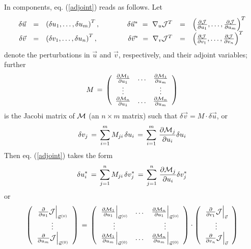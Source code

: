 In components, eq. (\ref{adjoint}) reads as follows.
Let
\[
\begin{array}{rclcrcl}
\delta \vec{u} & = &
\left( \delta u_1,\ldots, \delta u_m \right)^T , & \qquad &
\delta \vec{u}^{\ast} \,\, = \,\, \nabla_u {\cal J}^T & = &
\left( 
\frac{\partial {\cal J}}{\partial u_1},\ldots, 
\frac{\partial {\cal J}}{\partial u_m}
\right)^T \\
\delta \vec{v} & = &
\left( \delta v_1,\ldots, \delta u_n \right)^T , & \qquad &
\delta \vec{v}^{\ast} \,\, = \,\, \nabla_v {\cal J}^T & = &
\left( 
\frac{\partial {\cal J}}{\partial v_1},\ldots, 
\frac{\partial {\cal J}}{\partial v_n}
\right)^T \\
\end{array}
\]
denote the perturbations in $\vec{u}$ and $\vec{v}$, respectively,
and their adjoint variables;
further
\[
M \, = \, \left(
\begin{array}{ccc}
\frac{\partial {\cal M}_1}{\partial u_1} & \ldots &
\frac{\partial {\cal M}_1}{\partial u_m} \\
\vdots & ~ & \vdots \\
\frac{\partial {\cal M}_n}{\partial u_1} & \ldots &
\frac{\partial {\cal M}_n}{\partial u_m} \\
\end{array}
\right)
\]
is the Jacobi matrix of $ {\cal M} $ 
(an $ n \times m $ matrix)
such that $ \delta \vec{v} = M \cdot \delta \vec{u} $, or
\[
\delta v_{j} 
\, = \, \sum_{i=1}^m M_{ji} \, \delta u_{i}
\, = \, \sum_{i=1}^m \, \frac{\partial {\cal M}_{j}}{\partial u_{i}} 
\delta u_{i}
\]
%
Then eq. (\ref{adjoint}) takes the form
\[
\delta u_{i}^{\ast} 
\, = \, \sum_{j=1}^n M_{ji} \, \delta v_{j}^{\ast}
\, = \, \sum_{j=1}^n \, \frac{\partial {\cal M}_{j}}{\partial u_{i}} 
\delta v_{j}^{\ast}
\]
%
or
%
\[
\left(
\begin{array}{c}
\left. \frac{\partial}{\partial u_1} {\cal J} \right|_{\vec{u}^{(0)}} \\
\vdots \\
\left. \frac{\partial}{\partial u_m} {\cal J} \right|_{\vec{u}^{(0)}} \\
\end{array}
\right)
\, = \,
\left(
\begin{array}{ccc}
\left. \frac{\partial {\cal M}_1}{\partial u_1} \right|_{\vec{u}^{(0)}} 
& \ldots &
\left. \frac{\partial {\cal M}_n}{\partial u_1} \right|_{\vec{u}^{(0)}} \\
\vdots & ~ & \vdots \\
\left. \frac{\partial {\cal M}_1}{\partial u_m} \right|_{\vec{u}^{(0)}} 
& \ldots &
\left. \frac{\partial {\cal M}_n}{\partial u_m} \right|_{\vec{u}^{(0)}} \\
\end{array}
\right)
\cdot
\left(
\begin{array}{c}
\left. \frac{\partial}{\partial v_1} {\cal J} \right|_{\vec{v}} \\
\vdots \\
\left. \frac{\partial}{\partial v_n} {\cal J} \right|_{\vec{v}} \\
\end{array}
\right)
\]
